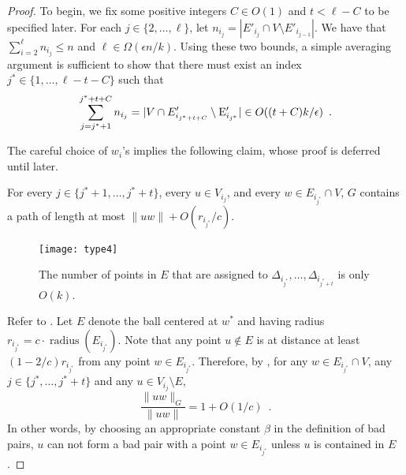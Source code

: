 \documentclass{patmorin}
\DeclareMathOperator{\radius}{radius}
\begin{document}
\begin{proof}
  To begin, we fix some positive integers $C\in O(1)$ and $t< \ell
  - C$ to be specified later.  For each $j\in\{2,\ldots,\ell\}$,
  let $n_{i_j}=|E'_{i_j}\cap V\setminus E'_{i_{j-1}}|$. We have that
  $\sum_{i=2}^{\ell} n_{i_j} \le n$ and $\ell \in\Omega(\epsilon n/k)$.
  Using these two bounds, a simple averaging argument is sufficient
  to show that there must exist an index $j^*\in\{1,\ldots,\ell-t-C\}$
  such that
  \begin{equation}
     \sum_{j=j^*+1}^{j^*+t+C} n_{i_j}
        = |V\cap E'_{i_{j^*+t+C}}\setminus \E'_{i_{j^*}}| 
          \in O((t+C)k/\epsilon) \enspace . \eqlabel{sparse}
  \end{equation}

  The careful choice of $w_i$'s implies the following claim, whose proof
  is deferred until later.
  \begin{clm}
    For every $j\in\{j^*+1,\ldots,j^*+t\}$, every $u\in V_{i_j}$, and
    every $w\in E_{i_{j^*}}\cap V$, $G$ contains a path of length at most
    $\|uw\|+O(r_{i_{j^*}}/c)$.
  \end{clm}

  \begin{figure}
    \begin{center}
      \texttt{[image: type4]}
    \end{center}
    \caption{The number of points in $E$ that are assigned to
      $\Delta_{i_{j^*}},\ldots,\Delta_{i_{j^*+t}}$
      is only $O(k)$.}
  \end{figure}

  Refer to .  Let $E$ denote the ball centered at $w^*$
  and having radius $r_{i_{j^*}}=c\cdot\radius(E_{i_{j^*}})$.  Note that
  any point $u\not\in E$ is at distance at least $(1-2/c)r_{i_{j^*}}$ from
  any point $w\in E_{i_{j^*}}$.  Therefore, by , for any
  $w\in E_{i_{j^*}}\cap V$, any $j\in\{j^*,\ldots,j^*+t\}$ and any $u\in
  V_{i_{j}}\setminus E$,
  \[  
     \frac{\|uw\|_G}{\|uw\|} = 1+O(1/c) \enspace . 
  \]
  In other words, by choosing an appropriate constant $\beta$ in the
  definition of bad pairs, $u$ can not form a bad pair with a point
  $w\in E_{i_{j^*}}$ unless $u$ is contained in $E$.



\end{proof}
\end{document}
